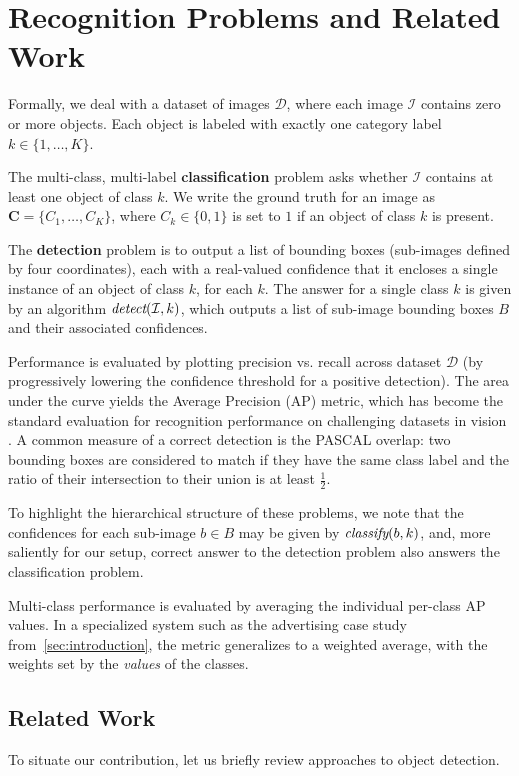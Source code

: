 \section{Recognition Problems and Related Work}

Formally, we deal with a dataset of images $\mathcal{D}$, where each image $\mathcal{I}$ contains zero or more objects.
Each object is labeled with exactly one category label $k \in \{1, \dots, K\}$.

The multi-class, multi-label \textbf{classification} problem asks whether $\mathcal{I}$ contains at least one object of class $k$.
We write the ground truth for an image as $\mathbf{C}=\{C_1,\dots,C_K\}$, where $C_k \in \{0,1\}$ is set to $1$ if an object of class $k$ is present.

The \textbf{detection} problem is to output a list of bounding boxes (sub-images defined by four coordinates), each with a real-valued confidence that it encloses a single instance of an object of class $k$, for each $k$.
The answer for a single class $k$ is given by an algorithm $\emph{detect}(\mathcal{I},k)$, which outputs a list of sub-image bounding boxes $B$ and their associated confidences.

Performance is evaluated by plotting precision vs. recall across dataset $\mathcal{D}$ (by progressively lowering the confidence threshold for a positive detection).
The area under the curve yields the Average Precision (AP) metric, which has become the standard evaluation for recognition performance on challenging datasets in vision \cite{pascal-voc-2010}.
A common measure of a correct detection is the PASCAL overlap: two bounding boxes are considered to match if they have the same class label and the ratio of their intersection to their union is at least $\frac{1}{2}$.

To highlight the hierarchical structure of these problems, we note that the confidences for each sub-image $b \in B$ may be given by $\emph{classify}(b,k)$, and, more saliently for our setup, correct answer to the detection problem also answers the classification problem.

Multi-class performance is evaluated by averaging the individual per-class AP values.
In a specialized system such as the advertising case study from~\autoref{sec:introduction}, the metric generalizes to a weighted average, with the weights set by the \emph{values} of the classes.

\subsection{Related Work}
To situate our contribution, let us briefly review approaches to object detection.

